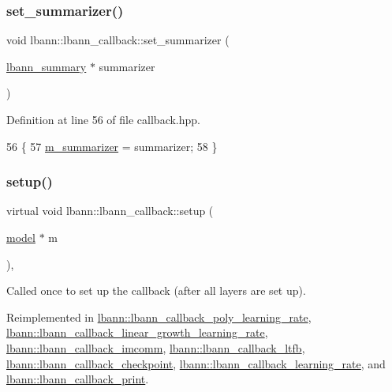 \subsubsection{\texorpdfstring{set\+\_\+summarizer()}{set\_summarizer()}}
{\footnotesize\ttfamily void lbann\+::lbann\+\_\+callback\+::set\+\_\+summarizer (\begin{DoxyParamCaption}\item[{\hyperlink{classlbann_1_1lbann__summary}{lbann\+\_\+summary} $\ast$}]{summarizer }\end{DoxyParamCaption})\hspace{0.3cm}{\ttfamily [inline]}}



Definition at line 56 of file callback.\+hpp.


\begin{DoxyCode}
56                                                  \{
57     \hyperlink{classlbann_1_1lbann__callback_a277d46138184f85f161a8263b8322c76}{m\_summarizer} = summarizer;
58   \}
\end{DoxyCode}
\mbox{\label{classlbann_1_1lbann__callback_aab5086e27d9bb0a7c7ee8ffc1bc58671}} 
\subsubsection{\texorpdfstring{setup()}{setup()}}
{\footnotesize\ttfamily virtual void lbann\+::lbann\+\_\+callback\+::setup (\begin{DoxyParamCaption}\item[{\hyperlink{classlbann_1_1model}{model} $\ast$}]{m }\end{DoxyParamCaption})\hspace{0.3cm}{\ttfamily [inline]}, {\ttfamily [virtual]}}

Called once to set up the callback (after all layers are set up). 

Reimplemented in \hyperlink{classlbann_1_1lbann__callback__poly__learning__rate_a47d3d2a94157f1992bf4a964620208f3}{lbann\+::lbann\+\_\+callback\+\_\+poly\+\_\+learning\+\_\+rate}, \hyperlink{classlbann_1_1lbann__callback__linear__growth__learning__rate_afaa81836e0dc1b6220212dad52df25fc}{lbann\+::lbann\+\_\+callback\+\_\+linear\+\_\+growth\+\_\+learning\+\_\+rate}, \hyperlink{classlbann_1_1lbann__callback__imcomm_a096555a87ce1bb011ceafb44081c4192}{lbann\+::lbann\+\_\+callback\+\_\+imcomm}, \hyperlink{classlbann_1_1lbann__callback__ltfb_a7548166d170eda00e4e0cba6626a1a78}{lbann\+::lbann\+\_\+callback\+\_\+ltfb}, \hyperlink{classlbann_1_1lbann__callback__checkpoint_a383654a7bb70672dfc9fef679f4b509f}{lbann\+::lbann\+\_\+callback\+\_\+checkpoint}, \hyperlink{classlbann_1_1lbann__callback__learning__rate_a501f31a6b8fde1282a60e4b347e8d9d3}{lbann\+::lbann\+\_\+callback\+\_\+learning\+\_\+rate}, and \hyperlink{classlbann_1_1lbann__callback__print_a405e20e9fa137bd377faf692cc3c54aa}{lbann\+::lbann\+\_\+callback\+\_\+print}.



